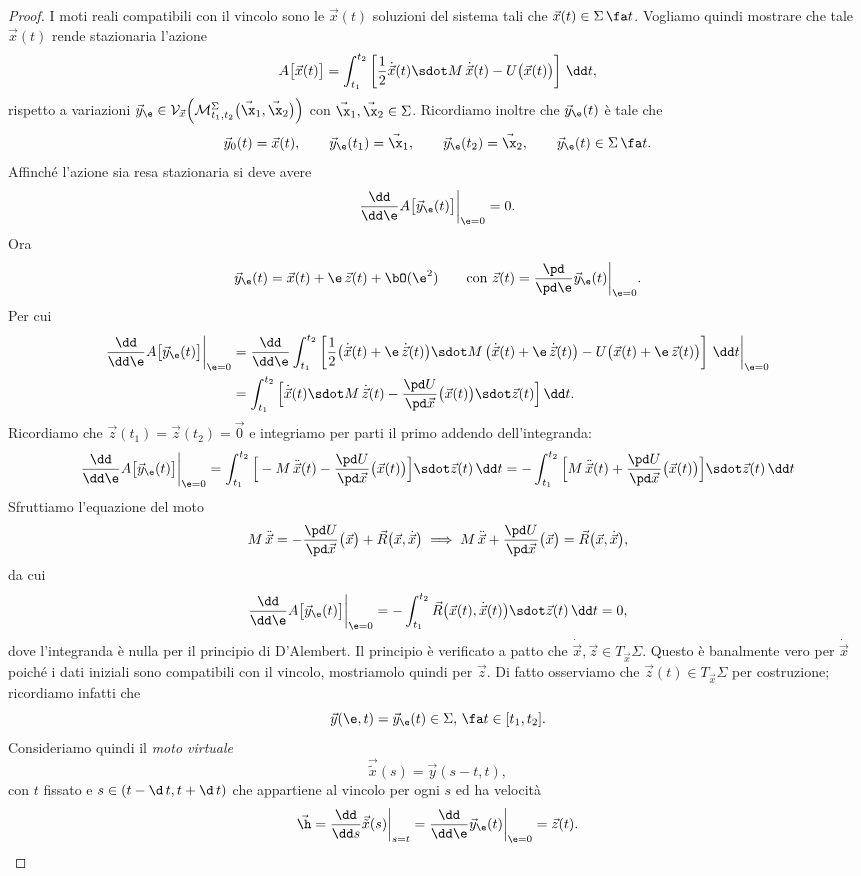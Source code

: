 \begin{proof}
	I moti reali compatibili con il vincolo sono le \(\vec{x}(t)\) soluzioni del sistema tali che \(\vec{x}(t)\in\Sigma\,\fa t\). Vogliamo quindi mostrare che tale \(\vec{x}(t)\) rende stazionaria l'azione
	\[
		A\big[\vec{x}(t)\big] = \int_{t_1}^{t_2}\left[\frac{1}{2}\dot{\vec{x}}(t)\sdot M\,\dot{\vec{x}}(t)-U\big(\vec{x}(t)\big)\right]\,\dd t,
	\]
	rispetto a variazioni \(\vec{y}_\e\in\mathcal{V}_{\vec{x}}\Big(\mathcal{M}_{t_1,t_2}^\Sigma\big(\vec{\x}_1,\vec{\x}_2\big)\Big)\) con \(\vec{\x}_1,\vec{\x}_2\in\Sigma\).
	Ricordiamo inoltre che \(\vec{y}_\e(t)\) è tale che
	\[
		\vec{y}_0(t) = \vec{x}(t), \qquad \vec{y}_\e(t_1) = \vec{\x}_1, \qquad \vec{y}_\e(t_2) = \vec{\x}_2, \qquad \vec{y}_\e(t)\in\Sigma\,\fa t.
	\]
	Affinché l'azione sia resa stazionaria si deve avere
	\[
		\frac{\dd}{\dd\e}A\big[\vec{y}_\e(t)\big]\bigg|_{\e=0} = 0.
	\]
	Ora
	\[
		\vec{y}_\e(t) = \vec{x}(t)+\e\,\vec{z}(t)+\bO(\e^2) \qquad\text{con }\vec{z}(t) = \frac{\pd}{\pd\e}\vec{y}_\e(t)\bigg|_{\e=0}.
	\]
	Per cui
	\[
		\begin{split}
			\frac{\dd}{\dd\e}A\big[\vec{y}_\e(t)\big]\bigg|_{\e=0} & = \frac{\dd}{\dd\e}\int_{t_1}^{t_2}\left[\frac{1}{2}\big(\dot{\vec{x}}(t)+\e\,\dot{\vec{z}}(t)\big)\sdot M\,\big(\dot{\vec{x}}(t)+\e\,\dot{\vec{z}}(t)\big)-U\big(\vec{x}(t)+\e\,\vec{z}(t)\big)\right]\,\dd t \bigg|_{\e=0}\\
			& = \int_{t_1}^{t_2}\Big[\dot{\vec{x}}(t)\sdot M\,\dot{\vec{z}}(t)-\frac{\pd U}{\pd\vec{x}}\big(\vec{x}(t)\big)\sdot \vec{z}(t)\Big]\,\dd t.
		\end{split}
	\]
	Ricordiamo che \(\vec{z}(t_1)=\vec{z}(t_2)=\vec{0}\) e integriamo per parti il primo addendo dell'integranda:
	\[
		\frac{\dd}{\dd\e}A\big[\vec{y}_\e(t)\big]\bigg|_{\e=0} = \int_{t_1}^{t_2}\Big[-M\,\ddot{\vec{x}}(t)-\frac{\pd U}{\pd\vec{x}}\big(\vec{x}(t)\big)\Big]\sdot \vec{z}(t)\,\dd t = - \int_{t_1}^{t_2}\Big[M\,\ddot{\vec{x}}(t)+\frac{\pd U}{\pd\vec{x}}\big(\vec{x}(t)\big)\Big]\sdot \vec{z}(t)\,\dd t
	\]
	Sfruttiamo l'equazione del moto
	\[
		M\,\ddot{\vec{x}} = -\frac{\pd U}{\pd\vec{x}}\big(\vec{x}\big) + \vec{R}\big(\vec{x},\dot{\vec{x}}\big) \implies M\,\ddot{\vec{x}} + \frac{\pd U}{\pd\vec{x}}\big(\vec{x}\big) = \vec{R}\big(\vec{x},\dot{\vec{x}}\big),
	\]
	da cui
	\[
		\frac{\dd}{\dd\e}A\big[\vec{y}_\e(t)\big]\bigg|_{\e=0} = -\int_{t_1}^{t_2}\vec{R}\big(\vec{x}(t),\dot{\vec{x}}(t)\big)\sdot \vec{z}(t)\,\dd t = 0,
	\]
	dove l'integranda è nulla per il principio di D'Alembert.
	Il principio è verificato a patto che \(\dot{\vec{x}},\vec{z}\in T_{\vec{x}}\Sigma\).
	Questo è banalmente vero per \(\dot{\vec{x}}\) poiché i dati iniziali sono compatibili con il vincolo, mostriamolo quindi per \(\vec{z}\). Di fatto osserviamo che \(\vec{z}(t)\in T_{\vec{x}}\Sigma\) per costruzione; ricordiamo infatti che
	\[
		\vec{y}(\e,t) = \vec{y}_\e(t)\in\Sigma,\,\fa t \in [t_1,t_2].
	\]
	Consideriamo quindi il \emph{moto virtuale}
	\[
		\vec{\tilde{x}}(s) = \vec{y}(s-t,t),
	\]
	con \(t\) fissato e \(s\in(t-\d\,t,t+\d\,t)\) che appartiene al vincolo per ogni \(s\) ed ha velocità
	\[
		\vec{\h} = \frac{\dd}{\dd s}\vec{\tilde{x}}(s)\bigg|_{s=t} = \frac{\dd}{\dd\e}\vec{y}_\e(t)\bigg|_{\e=0} = \vec{z}(t).\qedhere
	\]
\end{proof}

